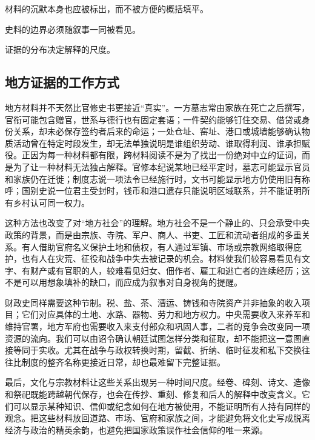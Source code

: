 材料的沉默本身也应被标出，而不被方便的概括填平。

史料的边界必须随叙事一同被看见。

证据的分布决定解释的尺度。

\subsection{地方证据的工作方式}
地方材料并不天然比官修史书更接近“真实”。一方墓志常由家族在死亡之后撰写，官衔可能包含赠官，世系与德行也有固定套语；一件契约能够钉住交易、借贷或身份关系，却未必保存签约者后来的命运；一处仓址、窑址、港口或城墙能够确认物质活动曾在特定时段发生，却无法单独说明是谁组织劳动、谁取得利润、谁承担赋役。正因为每一种材料都有限，跨材料阅读不是为了找出一份绝对中立的证词，而是为了让一种材料无法独占解释。官修本纪说某地已经平定时，墓志可能显示官员和家族仍在迁徙；制度志说一项法令已经施行时，文书可能显示地方仍使用旧有称呼；国别史说一位君主受封时，钱币和港口遗存只能说明区域联系，并不能证明所有乡村认可同一权力。

这种方法也改变了对“地方社会”的理解。地方社会不是一个静止的、只会承受中央政策的背景，而是由宗族、寺院、军户、商人、书吏、工匠和流动者组成的多重关系。有人借助官府名义保护土地和债权，有人通过军镇、市场或宗教网络取得庇护，也有人在灾荒、征役和战争中失去被记录的机会。材料使我们较容易看见有文字、有财产或有官职的人，较难看见妇女、佃作者、雇工和逃亡者的连续经历；这不是可以用想象填补的缺口，而应成为叙事对自身视角的提醒。

财政史同样需要这种节制。税、盐、茶、漕运、铸钱和寺院资产并非抽象的收入项目；它们对应具体的土地、水路、器物、劳力和地方权力。中央需要收入来养军和维持官署，地方军府也需要收入来支付部众和巩固人事，二者的竞争会改变同一项资源的流向。我们可以由诏令确认朝廷试图怎样分类和征取，却不能把这一意图直接等同于实收。尤其在战争与政权转换时期，留截、折纳、临时征发和私下交换往往比制度的整齐名称更接近日常，却也最难留下完整证据。

最后，文化与宗教材料让这些关系出现另一种时间尺度。经卷、碑刻、诗文、造像和祭祀既能跨越朝代保存，也会在传抄、重刻、修复和后人的解释中改变含义。它们可以显示某种知识、信仰或纪念如何在地方被使用，不能证明所有人持有同样的观念。把这些材料放回道路、市场、官府和家族之间，才能避免将文化史写成脱离经济与政治的精英余韵，也避免把国家政策误作社会信仰的唯一来源。
